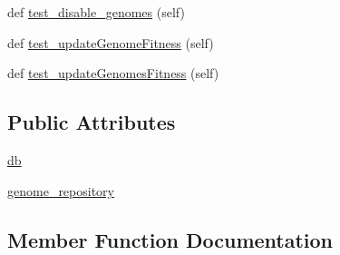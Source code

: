 \begin{DoxyCompactItemize}
\item 
def \hyperlink{classNEAT__PyGenetics_1_1NEAT_1_1Tests_1_1RepositoryTests_1_1test__genomeRepository_1_1TestGenomeRepository_afae413c9c9b8b83f271d344f6dcfb011}{test\+\_\+disable\+\_\+genomes} (self)
\item 
def \hyperlink{classNEAT__PyGenetics_1_1NEAT_1_1Tests_1_1RepositoryTests_1_1test__genomeRepository_1_1TestGenomeRepository_ac6c6f9cb1fe7c4eea5d275d9328251f0}{test\+\_\+update\+Genome\+Fitness} (self)
\item 
def \hyperlink{classNEAT__PyGenetics_1_1NEAT_1_1Tests_1_1RepositoryTests_1_1test__genomeRepository_1_1TestGenomeRepository_a44ba604161024b4d4bd2ae96d1c03414}{test\+\_\+update\+Genomes\+Fitness} (self)
\end{DoxyCompactItemize}
\subsection*{Public Attributes}
\begin{DoxyCompactItemize}
\item 
\hyperlink{classNEAT__PyGenetics_1_1NEAT_1_1Tests_1_1RepositoryTests_1_1test__genomeRepository_1_1TestGenomeRepository_a026af3e6ffc3797684a27e39a828e049}{db}
\item 
\hyperlink{classNEAT__PyGenetics_1_1NEAT_1_1Tests_1_1RepositoryTests_1_1test__genomeRepository_1_1TestGenomeRepository_af758f0a978c4639ead0e8f5f9c6112e9}{genome\+\_\+repository}
\end{DoxyCompactItemize}


\subsection{Member Function Documentation}
